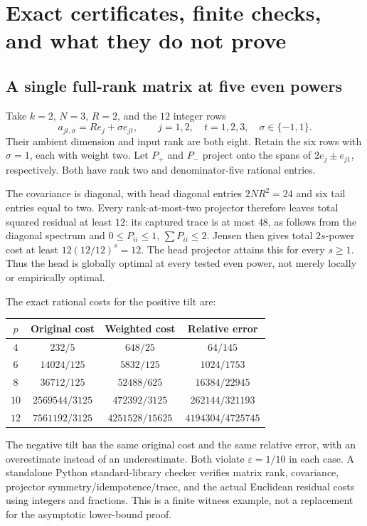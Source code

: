 \documentclass[11pt]{article}
\theoremstyle{remark}\newtheorem{remark}[theorem]{Remark}
\newcommand{\eps}{\varepsilon}\newcommand{\Sym}{\operatorname{Sym}}
\begin{document}
\section{Exact certificates, finite checks, and what they do not prove}\label{sec:verification}
\subsection{A single full-rank matrix at five even powers}
Take $k=2$, $N=3$, $R=2$, and the $12$ integer rows
\[
 a_{jt,\sigma}=Re_j+\sigma e_{jt},\qquad j=1,2,\quad t=1,2,3,\quad\sigma\in\{-1,1\}.
\]
Their ambient dimension and input rank are both eight. Retain the six rows with $\sigma=1$, each with weight two. Let $P_+$ and $P_-$ project onto the spans of $2e_j\pm e_{j1}$, respectively. Both have rank two and denominator-five rational entries.

The covariance is diagonal, with head diagonal entries $2NR^2=24$ and six tail entries equal to two. Every rank-at-most-two projector therefore leaves total squared residual at least $12$: its captured trace is at most $48$, as follows from the diagonal spectrum and $0\le P_{ii}\le1$, $\sum P_{ii}\le2$. Jensen then gives total $2s$-power cost at least $12(12/12)^s=12$. The head projector attains this for every $s\ge1$. Thus the head is globally optimal at every tested even power, not merely locally or empirically optimal.

The exact rational costs for the positive tilt are:
\begin{center}
\begin{tabular}{cccc}
\toprule
$p$ & Original cost & Weighted cost & Relative error\\
\midrule
$4$ & $232/5$ & $648/25$ & $64/145$\\
$6$ & $14024/125$ & $5832/125$ & $1024/1753$\\
$8$ & $36712/125$ & $52488/625$ & $16384/22945$\\
$10$ & $2569544/3125$ & $472392/3125$ & $262144/321193$\\
$12$ & $7561192/3125$ & $4251528/15625$ & $4194304/4725745$\\
\bottomrule
\end{tabular}
\end{center}
The negative tilt has the same original cost and the same relative error, with an overestimate instead of an underestimate. Both violate $\eps=1/10$ in each case. A standalone Python standard-library checker verifies matrix rank, covariance, projector symmetry/idempotence/trace, and the actual Euclidean residual costs using integers and fractions. This is a finite witness example, not a replacement for the asymptotic lower-bound proof.
\end{document}
